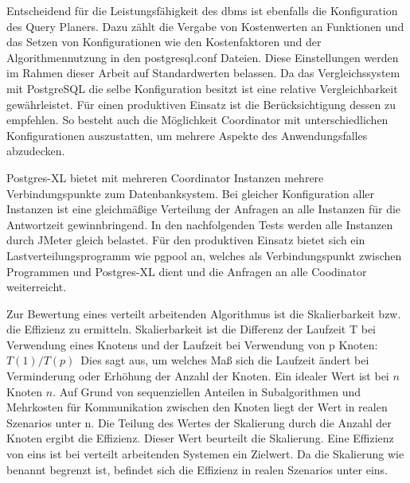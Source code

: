 Entscheidend für die Leistungsfähigkeit des \Gls{dbms} ist ebenfalls die Konfiguration des Query Planers.
Dazu zählt die Vergabe von Kostenwerten an Funktionen und das Setzen von Konfigurationen wie den Kostenfaktoren und der Algorithmennutzung in den postgresql.conf Dateien.
Diese Einstellungen werden im Rahmen dieser Arbeit auf Standardwerten belassen.
Da das Vergleichssystem mit PostgreSQL die selbe Konfiguration besitzt ist eine relative Vergleichbarkeit gewährleistet.
Für einen produktiven Einsatz ist die Berücksichtigung dessen zu empfehlen.
So besteht auch die Möglichkeit Coordinator mit unterschiedlichen Konfigurationen auszustatten, um mehrere Aspekte des Anwendungsfalles abzudecken.

Postgres-XL bietet mit mehreren Coordinator Instanzen mehrere Verbindungspunkte zum Datenbanksystem.
Bei gleicher Konfiguration aller Instanzen ist eine gleichmäßige Verteilung der Anfragen an alle Instanzen für die Antwortzeit gewinnbringend.
In den nachfolgenden Tests werden alle Instanzen durch JMeter gleich belastet.
Für den produktiven Einsatz bietet sich ein Lastverteilungsprogramm wie pgpool an, welches als Verbindungspunkt zwischen Programmen und Postgres-XL dient und die Anfragen an alle Coodinator weiterreicht.

Zur Bewertung eines verteilt arbeitenden Algorithmus ist die Skalierbarkeit bzw. die Effizienz zu ermitteln.
Skalierbarkeit ist die Differenz der Laufzeit T bei Verwendung eines Knotens und der Laufzeit bei Verwendung von p Knoten:
$T(1)/T(p)$\ 
Dies sagt aus, um welches Maß sich die Laufzeit ändert bei Verminderung oder Erhöhung der Anzahl der Knoten.
Ein idealer Wert ist bei $n$ Knoten $n$.
Auf Grund von sequenziellen Anteilen in Subalgorithmen und Mehrkosten für Kommunikation zwischen den Knoten liegt der Wert in realen Szenarios unter n.
Die Teilung des Wertes der Skalierung durch die Anzahl der Knoten ergibt die Effizienz.
Dieser Wert beurteilt die Skalierung.
Eine Effizienz von eins ist bei verteilt arbeitenden Systemen ein Zielwert.
Da die Skalierung wie benannt begrenzt ist, befindet sich die Effizienz in realen Szenarios unter eins.

